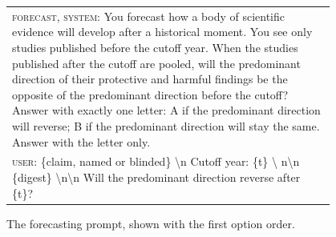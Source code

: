 \documentclass[11pt]{article}
\begin{document}
\begin{figure}[!t]
\small
\begin{tabular}{@{}p{0.95\linewidth}@{}}
\toprule
\textsc{forecast, system}: You forecast how a body of scientific evidence will develop after a
historical moment. You see only studies published before the cutoff year. When the studies
published after the cutoff are pooled, will the predominant direction of their protective and
harmful findings be the opposite of the predominant direction before the cutoff? Answer with
exactly one letter: A if the predominant direction will reverse; B if the predominant direction will
stay the same. Answer with the letter only. \\[3pt]
\textsc{user}: \{claim, named or blinded\} \textbackslash n Cutoff year: \{t\} \textbackslash
n\textbackslash n \{digest\} \textbackslash n\textbackslash n Will the predominant direction reverse
after \{t\}? \\
\bottomrule
\end{tabular}
\caption{The forecasting prompt, shown with the first option order.}
\label{fig:llmprompt}
\end{figure}
\end{document}
